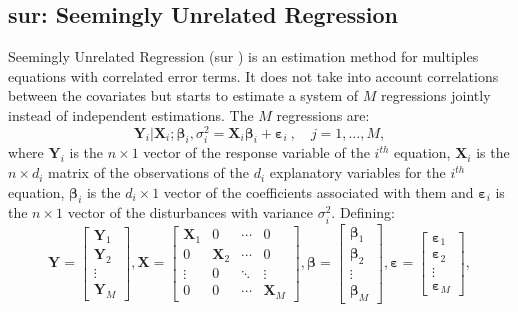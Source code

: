 \documentclass[12pt,a4paper]{report}
\begin{document}
		\subsection{{\sc sur}: Seemingly Unrelated Regression}		%
		Seemingly Unrelated Regression ({\sc sur} \cite{SURzellner}) is an estimation method for multiples equations with correlated error terms. It does not take into account correlations between the covariates but starts to estimate a system of $M$ regressions jointly instead of independent estimations. 
The $M$ regressions are:		
		\begin{equation}
		 \boldsymbol{Y}_i|\boldsymbol{X}_i;\boldsymbol{\beta}_i,\sigma_i^2=\boldsymbol{X}_i\boldsymbol{\beta}_i+\boldsymbol{\varepsilon}_i\ ,\quad j=1,\dots,M,\nonumber
		\end{equation}
		where $\boldsymbol{Y}_i$ is the $n\times 1$ vector of the response variable of the $i^{th}$ equation, $\boldsymbol{X}_i$ is the $n \times d_i$ matrix of the observations of the $d_i$ explanatory variables for the $i^{th}$ equation, $\boldsymbol{\beta}_i$ is the $d_i \times 1$ vector of the coefficients associated with them and $\boldsymbol{\varepsilon}_i$ is the $n\times 1$ vector of the disturbances with variance $\sigma_i^2$.
Defining:
\begin{displaymath}
	\boldsymbol{Y}=\left[\begin{array}{c}
	 \boldsymbol{Y}_1\\ 
	\boldsymbol{Y}_2 \\ 
	\vdots \\ 
	\boldsymbol{Y}_M
	\end{array}  \right],
	\boldsymbol{X}=\left[\begin{array}{cccc}
	 \boldsymbol{X}_1&0 &\cdots &0 \\ 
	0&\boldsymbol{X}_2 &\cdots &0 \\ 
	\vdots & 0 & \ddots &\vdots \\ 
	0 & 0 &\cdots &\boldsymbol{X}_M 
	\end{array}  \right],
	\boldsymbol{\beta}=\left[\begin{array}{c}
	\boldsymbol{\beta}_1 \\ 
	\boldsymbol{\beta}_2 \\ 
	\vdots \\ 
	\boldsymbol{\beta}_M
	\end{array}  \right],
	\boldsymbol{\varepsilon}=\left[\begin{array}{c}
	 \boldsymbol{\varepsilon}_1\\ 
	\boldsymbol{\varepsilon}_2 \\ 
	\vdots \\ 
	\boldsymbol{\varepsilon}_M
	\end{array}  \right],
\end{displaymath}		
\end{document}
